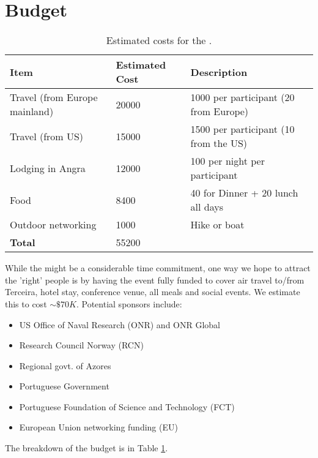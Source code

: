 \section{Budget}
\label{sec:budget}

\begin{table}[!]
  \centering
  \begin{tabular}{|p{4cm}|p{2.5cm}|p{7cm}|}
    \hline 
    \rowcolor{Gray}
    \bfseries Item& \bfseries Estimated Cost&\bfseries Description\\
    \hline
    Travel (from Europe mainland)& 20000 & 1000 per participant (20 from Europe) \\
    \hline
    Travel (from US)& 15000 & 1500 per participant (10 from the US) \\
    \hline
    Lodging in Angra & 12000 & 100 per night per participant \\
    \hline
    Food& 8400 & 40 for Dinner + 20 lunch all days\\
    \hline
    Outdoor networking& 1000 & Hike or boat\\
    \hline
    \textbf{Total}& 55200 &\\
    \hline        
  \end{tabular}
  \caption{Estimated costs for the \sympe.}
  \label{tab:budget}
\end{table}

While the \symp might be a considerable time commitment, one way we hope
to attract the 'right' people is by having the event fully funded to
cover air travel to/from Terceira, hotel stay, conference venue, all
meals and social events. We estimate this to cost $\sim
\$70K$. Potential sponsors include:

\begin{itemize}[noitemsep,topsep=0pt,parsep=0pt,partopsep=0pt]

  \item US Office of Naval Research (ONR) and ONR Global
  \item Research Council Norway (RCN)
  \item Regional govt. of Azores
  \item Portuguese Government
  \item Portuguese Foundation of Science and Technology (FCT)
  \item European Union networking funding (EU)

\end{itemize}

The breakdown of the budget is in Table \ref{tab:budget}.

